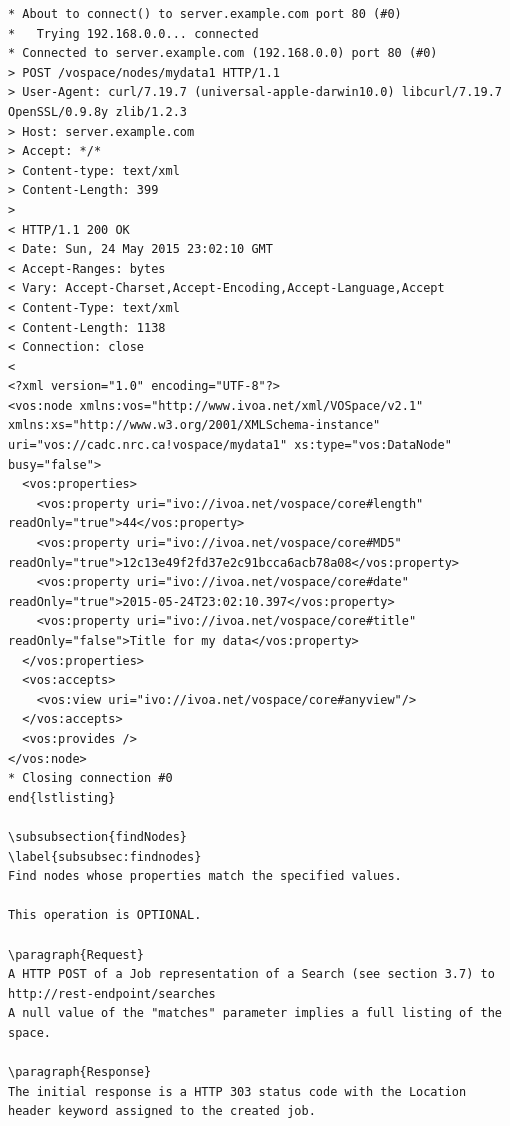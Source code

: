 \documentclass[11pt,a4paper]{ivoa}
\begin{document}
\begin{lstlisting}
* About to connect() to server.example.com port 80 (#0)
*   Trying 192.168.0.0... connected
* Connected to server.example.com (192.168.0.0) port 80 (#0)
> POST /vospace/nodes/mydata1 HTTP/1.1
> User-Agent: curl/7.19.7 (universal-apple-darwin10.0) libcurl/7.19.7 OpenSSL/0.9.8y zlib/1.2.3
> Host: server.example.com
> Accept: */*
> Content-type: text/xml
> Content-Length: 399
>
< HTTP/1.1 200 OK
< Date: Sun, 24 May 2015 23:02:10 GMT
< Accept-Ranges: bytes
< Vary: Accept-Charset,Accept-Encoding,Accept-Language,Accept
< Content-Type: text/xml
< Content-Length: 1138
< Connection: close
<
<?xml version="1.0" encoding="UTF-8"?>
<vos:node xmlns:vos="http://www.ivoa.net/xml/VOSpace/v2.1" xmlns:xs="http://www.w3.org/2001/XMLSchema-instance" uri="vos://cadc.nrc.ca!vospace/mydata1" xs:type="vos:DataNode" busy="false">
  <vos:properties>
    <vos:property uri="ivo://ivoa.net/vospace/core#length" readOnly="true">44</vos:property>
    <vos:property uri="ivo://ivoa.net/vospace/core#MD5" readOnly="true">12c13e49f2fd37e2c91bcca6acb78a08</vos:property>
    <vos:property uri="ivo://ivoa.net/vospace/core#date" readOnly="true">2015-05-24T23:02:10.397</vos:property>
    <vos:property uri="ivo://ivoa.net/vospace/core#title" readOnly="false">Title for my data</vos:property>
  </vos:properties>
  <vos:accepts>
    <vos:view uri="ivo://ivoa.net/vospace/core#anyview"/>
  </vos:accepts>
  <vos:provides />
</vos:node>
* Closing connection #0
end{lstlisting}

\subsubsection{findNodes}
\label{subsubsec:findnodes}
Find nodes whose properties match the specified values.

This operation is OPTIONAL.

\paragraph{Request}
A HTTP POST of a Job representation of a Search (see section 3.7) to http://rest-endpoint/searches
A null value of the "matches" parameter implies a full listing of the space.

\paragraph{Response}
The initial response is a HTTP 303 status code with the Location header keyword assigned to the created job.


\end{lstlisting}
\end{document}

